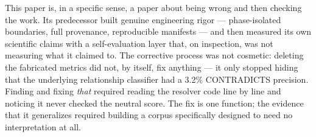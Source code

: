 This paper is, in a specific sense, a paper about being wrong and then
checking the work. Its predecessor built genuine engineering rigor ---
phase-isolated boundaries, full provenance, reproducible manifests --- and
then measured its own scientific claims with a self-evaluation layer that,
on inspection, was not measuring what it claimed to. The corrective
process was not cosmetic: deleting the fabricated metrics did not, by
itself, fix anything --- it only stopped hiding that the underlying
relationship classifier had a 3.2\% CONTRADICTS precision. Finding and
fixing \emph{that} required reading the resolver code line by line and
noticing it never checked the neutral score. The fix is one function; the
evidence that it generalizes required building a corpus specifically
designed to need no interpretation at all.


